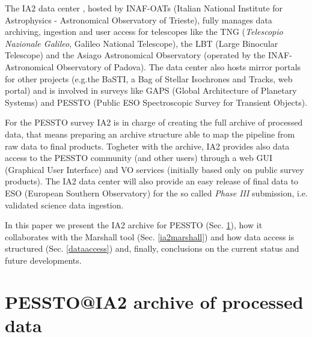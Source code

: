 The IA2 data center \citep{molinaro_spie12}, hosted by INAF-OATs (Italian National Institute for Astrophysics - Astronomical Observatory of Trieste), fully manages data archiving, ingestion and user access for telescopes like the TNG (\textit{Telescopio Nazionale Galileo}, Galileo National Telescope), the LBT (Large Binocular Telescope) and the Asiago Astronomical Observatory (operated by the INAF-Astronomical Observatory of Padova). The data center also hosts mirror portals for other projects (e.g.the BaSTI, a Bag of Stellar Isochrones and Tracks, web portal) and is involved in surveys like GAPS (Global Architecture of Planetary Systems) and PESSTO (Public ESO Spectroscopic Survey for Transient Objects).

For the PESSTO survey IA2 is in charge of creating the full archive of processed data, that means preparing an archive structure able to map the pipeline from raw data to final products. Togheter with the archive, IA2 provides also data access to the PESSTO community (and other users) through a web GUI (Graphical User Interface) and VO services (initially based only on public survey products). The IA2 data center will also provide an easy release of final data to ESO (European Southern Observatory) for the so called \textit{Phase III} submission, i.e. validated science data ingestion.

In this paper we present the IA2 archive for PESSTO (Sec. \ref{ia2archive}), how it collaborates with the Marshall tool (Sec. \ref{ia2marshall}) and how data access is structured (Sec. \ref{dataaccess}) and, finally, conclusions on the current status and future developments.

\section{PESSTO@IA2 archive of processed data}\label{ia2archive}


